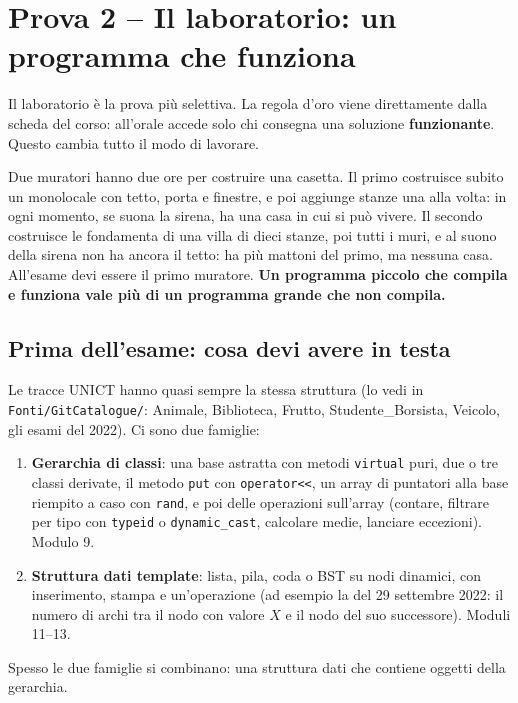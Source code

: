 \section{Prova 2 -- Il laboratorio: un programma che funziona}

Il laboratorio è la prova più selettiva. La regola d'oro viene direttamente dalla scheda
del corso: all'orale accede solo chi consegna una soluzione \textbf{funzionante}. Questo
cambia tutto il modo di lavorare.

\begin{analogia}
Due muratori hanno due ore per costruire una casetta. Il primo costruisce subito un
monolocale con tetto, porta e finestre, e poi aggiunge stanze una alla volta: in ogni
momento, se suona la sirena, ha una casa in cui si può vivere. Il secondo costruisce le
fondamenta di una villa di dieci stanze, poi tutti i muri, e al suono della sirena non ha
ancora il tetto: ha più mattoni del primo, ma nessuna casa. All'esame devi essere il
primo muratore. \textbf{Un programma piccolo che compila e funziona vale più di un
programma grande che non compila.}
\end{analogia}

\subsection*{Prima dell'esame: cosa devi avere in testa}

Le tracce UNICT hanno quasi sempre la stessa struttura (lo vedi in
\texttt{Fonti/GitCatalogue/}: Animale, Biblioteca, Frutto, Studente\_Borsista, Veicolo,
gli esami del 2022). Ci sono due famiglie:
\begin{enumerate}
  \item \textbf{Gerarchia di classi}: una base astratta con metodi \texttt{virtual} puri,
        due o tre classi derivate, il metodo \texttt{put} con \texttt{operator<<}, un array
        di puntatori alla base riempito a caso con \texttt{rand}, e poi delle operazioni
        sull'array (contare, filtrare per tipo con \texttt{typeid} o
        \texttt{dynamic\_cast}, calcolare medie, lanciare eccezioni). Modulo 9.
  \item \textbf{Struttura dati template}: lista, pila, coda o BST su nodi dinamici, con
        inserimento, stampa e un'operazione  (ad esempio la  del 29 settembre 2022: il numero di archi tra il nodo con valore $X$
        e il nodo del suo successore). Moduli 11--13.
\end{enumerate}
Spesso le due famiglie si combinano: una struttura dati che contiene oggetti della
gerarchia.

